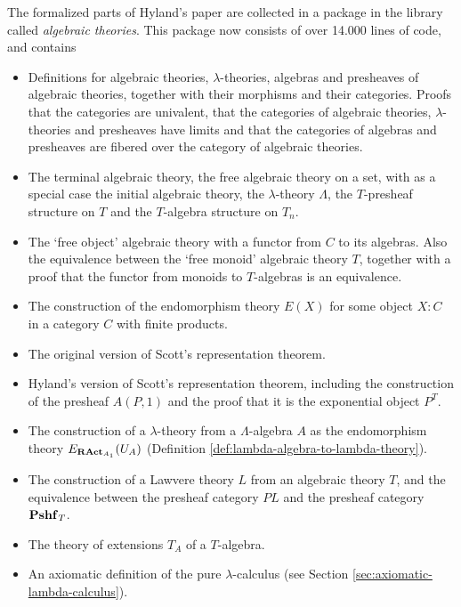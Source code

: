 The formalized parts of Hyland's paper are collected in a package in the library called \textit{algebraic theories}. This package now consists of over 14.000 lines of code, and contains
\begin{itemize}
  \item Definitions for algebraic theories, $ \lambda $-theories, algebras and presheaves of algebraic theories, together with their morphisms and their categories. Proofs that the categories are univalent, that the categories of algebraic theories, $ \lambda $-theories and presheaves have limits and that the categories of algebras and presheaves are fibered over the category of algebraic theories.
  \item The terminal algebraic theory, the free algebraic theory on a set, with as a special case the initial algebraic theory, the $ \lambda $-theory $ \Lambda $, the $ T $-presheaf structure on $ T $ and the $ T $-algebra structure on $ T_n $.
  \item The `free object' algebraic theory with a functor from $ C $ to its algebras. Also the equivalence between the `free monoid' algebraic theory $ T $, together with a proof that the functor from monoids to $ T $-algebras is an equivalence.
  \item The construction of the endomorphism theory $ E(X) $ for some object $ X : C $ in a category $ C $ with finite products.
  \item The original version of Scott's representation theorem.
  \item Hyland's version of Scott's representation theorem, including the construction of the presheaf $ A(P, 1) $ and the proof that it is the exponential object $ P^T $.
  \item The construction of a $ \lambda $-theory from a $ \Lambda $-algebra $ A $ as the endomorphism theory $ E_{\mathbf{RAct}_{A_1}}(U_A) $ (Definition \ref{def:lambda-algebra-to-lambda-theory}).
  \item The construction of a Lawvere theory $ L $ from an algebraic theory $ T $, and the equivalence between the presheaf category $ PL $ and the presheaf category $ \mathbf{Pshf}_{T} $.
  \item The theory of extensions $ T_A $ of a $ T $-algebra.
  \item An axiomatic definition of the pure $ \lambda $-calculus (see Section \ref{sec:axiomatic-lambda-calculus}).
\end{itemize}

